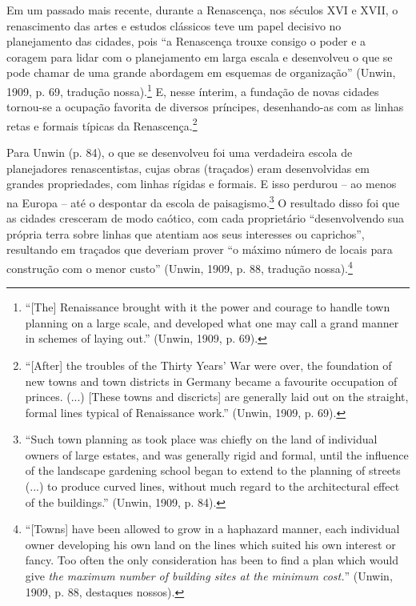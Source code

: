 \documentclass[12pt, a4paper]{book} %
\begin{document}
        Em um passado mais recente, durante a Renascença, nos séculos XVI e XVII, o renascimento das artes e estudos clássicos teve um papel decisivo no planejamento das cidades, pois ``a Renascença trouxe consigo o poder e a coragem para lidar com o planejamento em larga escala e desenvolveu o que se pode chamar de uma grande abordagem em esquemas de organização'' (Unwin, 1909, p. 69, tradução nossa).\footnote[14]{``[The] Renaissance brought with it the power and courage to handle town planning on a large scale, and developed what one may call a grand manner in schemes of laying out.'' (Unwin, 1909, p. 69).} E, nesse ínterim, a fundação de novas cidades tornou-se a ocupação favorita de diversos príncipes, desenhando-as com as linhas retas e formais típicas da Renascença.\footnote[15]{``[After] the troubles of the Thirty Years' War were over, the foundation of new towns and town districts in Germany became a favourite occupation of princes. (...) [These towns and discricts] are generally laid out on the straight, formal lines typical of Renaissance work.'' (Unwin, 1909, p. 69).}

        Para Unwin (p. 84), o que se desenvolveu foi uma verdadeira escola de planejadores renascentistas, cujas obras (traçados) eram desenvolvidas em grandes propriedades, com linhas rígidas e formais. E isso perdurou – ao menos na Europa – até o despontar da escola de paisagismo.\footnote[16]{``Such town planning as took place was chiefly on the land of individual owners of large estates, and was generally rigid and formal, until the influence of the landscape gardening school began to extend to the planning of streets (...) to produce curved lines, without much regard to the architectural effect of the buildings.'' (Unwin, 1909, p. 84).} O resultado disso foi que as cidades cresceram de modo caótico, com cada proprietário ``desenvolvendo sua própria terra sobre linhas que atentiam aos seus interesses ou caprichos'', resultando em traçados que deveriam prover ``o máximo número de locais para construção com o menor custo'' (Unwin, 1909, p. 88, tradução nossa).\footnote[17]{``[Towns] have been allowed to grow in a haphazard manner, each individual owner developing his own land on the lines which suited his own interest or fancy. Too often the only consideration has been to find a plan which would give \textit{the maximum number of building sites at the minimum cost.}'' (Unwin, 1909, p. 88, destaques nossos).}
\end{document}

